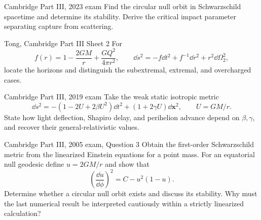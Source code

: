 \begin{exercises}
\begin{exercise}{Cambridge Part III, 2023 exam}
Find the circular null orbit in Schwarzschild spacetime and determine its
stability.  Derive the critical impact parameter separating capture from
scattering.
\end{exercise}

\begin{exercise}{Tong, Cambridge Part III Sheet 2}
For
\[
f(r)=1-\frac{2GM}{r}+\frac{GQ^2}{4\pi r^2},
\qquad
\dd s^2=-f\dd t^2+f^{-1}\dd r^2+r^2\dd\Omega_2^2,
\]
locate the horizons and distinguish the subextremal, extremal, and
overcharged cases.
\end{exercise}

\begin{exercise}{Cambridge Part III, 2019 exam}
Take the weak static isotropic metric
\[
\dd s^2=-(1-2U+2\beta U^2)\dd t^2
+(1+2\gamma U)\dd\bm x^2,\qquad U=GM/r.
\]
State how light deflection, Shapiro delay, and perihelion advance depend on
\(\beta,\gamma\), and recover their general-relativistic values.
\end{exercise}

\begin{exercise}{Cambridge Part III, 2005 exam, Question 3}
Obtain the first-order Schwarzschild metric from the linearized Einstein
equations for a point mass.  For an equatorial null geodesic define
\(u=2GM/r\) and show that
\[
\left(\frac{\dd u}{\dd\phi}\right)^2
=C-u^2(1-u).
\]
Determine whether a circular null orbit exists and discuss its stability.
Why must the last numerical result be interpreted cautiously within a
strictly linearized calculation?
\end{exercise}



\end{exercises}

